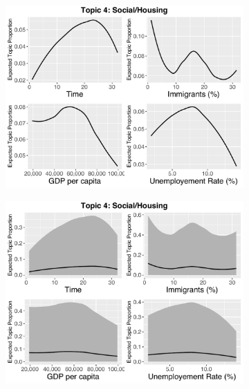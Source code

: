 \begin{figure}[h!]
    \centering
  \begin{subfigure}[b]{0.3\linewidth}
    \includegraphics[width=\linewidth]{../plots/appendix/4_4/direct_t4_without_credible.pdf}
  \end{subfigure}
  \begin{subfigure}[b]{0.3\linewidth}
    \includegraphics[width=\linewidth]{../plots/appendix/4_4/direct_t4_with_credible.pdf}
  \end{subfigure}
  \begin{subfigure}[b]{0.3\linewidth}

\end{subfigure}
\end{figure}

